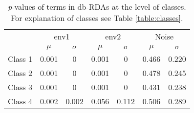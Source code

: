 		\begin{table*}[h!] 
				
			\small
				\caption{\textit{p}-values of terms in db-RDAs at the level of classes. For explanation of classes see Table \ref{table:classes}.}
				\centering
				
				\begin{tabular}{@{}lcccccc@{}}
					
					\toprule
					& \multicolumn{2}{c}{env1} & \multicolumn{2}{c}{env2} & \multicolumn{2}{c}{Noise}\\\cmidrule(l){2-3} \cmidrule(l){4-5} \cmidrule(l){6-7}
					& $\mu$ & $\sigma$ & $\mu$ & $\sigma$ & $\mu$ & $\sigma$\\
					\hline
					Class 1 & 0.001 & 0 & 0.001 & 0 & 0.466 & 0.220\\
					Class 2 & 0.001 & 0 & 0.001 & 0 & 0.478 & 0.245\\
					Class 3 & 0.001 & 0 & 0.001 & 0 & 0.431 & 0.238\\
					Class 4 & 0.002 & 0.002 & 0.056 & 0.112 & 0.506 & 0.289\\
					\toprule
					
				\end{tabular}
			
				\label{tab:dbsm2}
			
		\end{table*}
		
